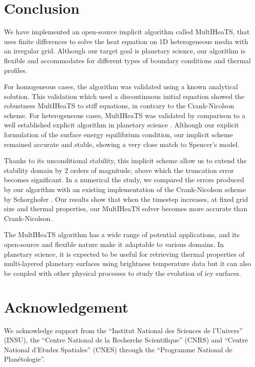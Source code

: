 \documentclass[]{interact}
\theoremstyle{plain}%
\theoremstyle{definition}
\theoremstyle{remark}
\begin{document}
 



\section{Conclusion}
We have implemented an open-source implicit algorithm called MultIHeaTS, that uses finite differences to solve the heat equation on 1D heterogeneous media with an irregular grid.
Although our target goal is planetary science, our algorithm is flexible and accommodates for different types of boundary conditions and thermal profiles. 

For homogeneous cases, the algorithm was validated using a known analytical solution.
This validation which used a discontinuous initial equation showed the robustness MultIHeaTS to stiff equations, in contrary to the Crank-Nicolson scheme.
For heterogeneous cases, MultIHeaTS was validated by comparison to a well established explicit algorithm in planetary science \cite{Spencer1989}.
Although our explicit formulation of the surface energy equilibrium condition, our implicit scheme remained accurate and stable, showing a very close match to Spencer's model.

Thanks to its unconditional stability, this implicit scheme allow us to extend the stability domain by 2 orders of magnitude, above which the truncation error becomes significant.
In a numerical the study, we compared the errors produced by our algorithm with an existing implementation of the Crank-Nicolson scheme by Schorghofer \cite{Schorghofer2010}.
Our results show that when the timestep increases, at fixed grid size and thermal properties, our MultIHeaTS solver becomes more accurate than Crank-Nicolson.

The MultIHeaTS algorithm has a wide range of potential applications, and its open-source and flexible nature make it adaptable to various domains. In planetary science, it is expected to be useful for retrieving thermal properties of multi-layered planetary surfaces using brightness temperature data but it can also be coupled with other physical processes to study the evolution of icy surfaces. 

\section*{Acknowledgement}
We acknowledge support from the ``Institut National des Sciences de l'Univers'' (INSU), the ``Centre National de la Recherche Scientifique'' (CNRS) and ``Centre National d'Etudes Spatiales'' (CNES) through the ``Programme National de Plan{\'e}tologie''. 
\end{document}
